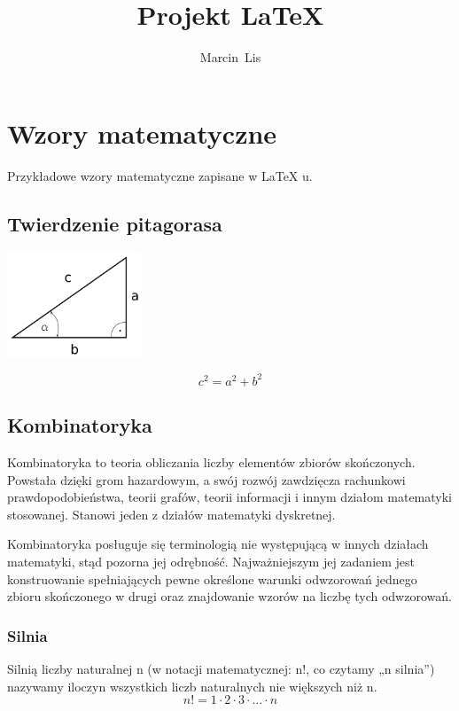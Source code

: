 \documentclass[a4paper,11pt]{article}
\author{Marcin~Lis}
\title{Projekt {\LaTeX} }
\begin{document}
\maketitle
\tableofcontents

\section{Wzory matematyczne}
Przykładowe wzory matematyczne zapisane w {LaTeX} u.

\subsection{Twierdzenie pitagorasa}
\begin{center}
\includegraphics[width=0.3\textwidth]{obrazy/trojkat}
\end{center}
\begin{displaymath}
c^{2}=a^{2}+b^{2}
\end{displaymath}

\subsection{Kombinatoryka}
Kombinatoryka to teoria obliczania liczby elementów zbiorów skończonych. Powstała dzięki grom hazardowym, a swój rozwój zawdzięcza rachunkowi prawdopodobieństwa, teorii grafów, teorii informacji i innym działom matematyki stosowanej. Stanowi jeden z działów matematyki dyskretnej.

Kombinatoryka posługuje się terminologią nie występującą w innych działach matematyki, stąd pozorna jej odrębność. Najważniejszym jej zadaniem jest konstruowanie spełniających pewne określone warunki odwzorowań jednego zbioru skończonego w drugi oraz znajdowanie wzorów na liczbę tych odwzorowań.

\subsubsection{Silnia}
Silnią liczby naturalnej n (w notacji matematycznej: n!, co czytamy „n silnia”) nazywamy iloczyn wszystkich liczb naturalnych nie większych niż n.
\begin{displaymath}
n! =1  \cdot 2 \cdot 3 \cdot \dots \cdot n
\end{displaymath}
\end{document}

